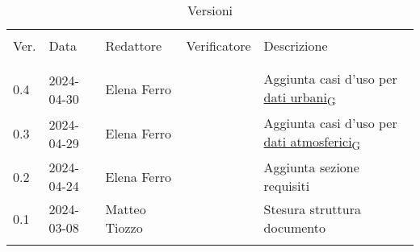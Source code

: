 \documentclass[12pt]{article}
\begin{document}


\newpage



\captionsetup[table]{list=no}
\begin{table}[!h]
	\footnotesize
	\begin{center}
		\caption*{Versioni}
		\vspace{0.5cm}
		\begin{tabular}{ l l l l p{6.1cm} }
			\hline                                                                                                                                                                                                   \\[-2ex]
			Ver. & Data       & Redattore     & Verificatore & Descrizione                                                                                                                                           \\
			\\[-2ex] \hline \\[-1.5ex]
			0.4  & 2024-04-30 & Elena Ferro   &              & Aggiunta casi d'uso per \href{https://7last.github.io/docs/rtb/documentazione-interna/glossario\#dati-urbani}{dati urbani\textsubscript{G}}           \\
			0.3  & 2024-04-29 & Elena Ferro   &              & Aggiunta casi d'uso per \href{https://7last.github.io/docs/rtb/documentazione-interna/glossario\#dati-atmosferici}{dati atmosferici\textsubscript{G}} \\
			0.2  & 2024-04-24 & Elena Ferro   &              & Aggiunta sezione requisiti                                                                                                                            \\
			0.1  & 2024-03-08 & Matteo Tiozzo &              & Stesura struttura documento                                                                                                                           \\
			\\[-1.5ex] \hline
		\end{tabular}
	\end{center}
\end{table}
\captionsetup[table]{list=yes}

\newpage

\tableofcontents
\listoftables

\newpage








\end{document}
